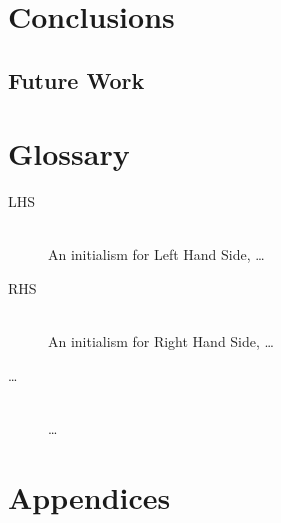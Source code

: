 \documentclass{UoYCSproject}
\begin{document}
\chapter{Conclusions}
\section{Future Work}
\chapter{Glossary}
\begin{description}
  \item[LHS] \hfill \\
  An initialism for Left Hand Side, \ldots
  \item[RHS] \hfill \\
  An initialism for Right Hand Side, \ldots
  \item[\ldots] \hfill \\
  \ldots
\end{description}

% 

\chapter{Appendices}
\end{document}
